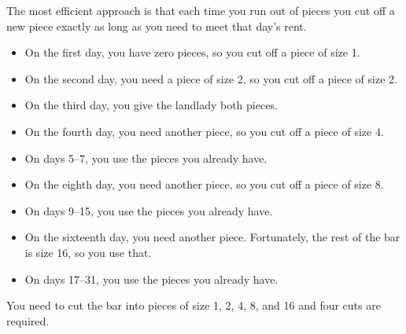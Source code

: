 \documentclass[letterpaper, landscape]{exam}
\begin{document}
  \begin{solution}

      The most efficient approach is that each time you run out of pieces
      you cut off a new piece exactly as long as you need to meet that
      day's rent.  

      \begin{itemize}
          \item On the first day, you have zero pieces, so you cut off a piece of size 1.  
          \item On the second day, you need a piece of size 2, so you cut off a piece of size 2.
          \item On the third day, you give the landlady both pieces.
          \item On the fourth day, you need another piece, so you cut off a piece of size 4.
          \item On days 5--7, you use the pieces you already have.
          \item On the eighth day, you need another piece, so you cut off a piece of size 8.
          \item On days 9--15, you use the pieces you already have.
          \item On the sixteenth day, you need another piece.  Fortunately, the rest of the bar is size 16, so you use that.
          \item On days 17--31, you use the pieces you already have.
      \end{itemize}

      You need to cut the bar into pieces of size 1, 2, 4, 8, and 16 and four cuts are required.

  \end{solution}
  \ifprintanswers{}
\end{document}

